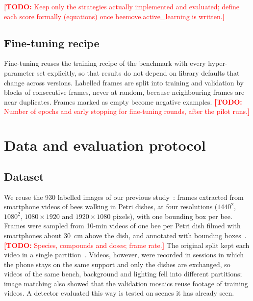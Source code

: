 \documentclass[pdflatex,sn-basic,Numbered]{sn-jnl}
\newcommand{\todo}[1]{\textcolor{red}{\textbf{[TODO:} #1\textbf{]}}}
\theoremstyle{thmstyleone}%
\begin{document}
\todo{Keep only the strategies actually implemented and evaluated; define each score formally (equations) once beemove.active\_learning is written.}

\subsection{Fine-tuning recipe}\label{sec:finetune}

Fine-tuning reuses the training recipe of the benchmark with every hyper-parameter set explicitly, so that results do not depend on library defaults that change across versions. Labelled frames are split into training and validation by blocks of consecutive frames, never at random, because neighbouring frames are near duplicates. Frames marked as empty become negative examples. \todo{Number of epochs and early stopping for fine-tuning rounds, after the pilot runs.}

\section{Data and evaluation protocol}\label{sec:protocol}

\subsection{Dataset}\label{sec:dataset}

We reuse the 930 labelled images of our previous study~\cite{lima2025analyzing}: frames extracted from smartphone videos of bees walking in Petri dishes, at four resolutions ($1440^2$, $1080^2$, $1080\times1920$ and $1920\times1080$ pixels), with one bounding box per bee. Frames were sampled from 10-min videos of one bee per Petri dish filmed with smartphones about 30~cm above the dish, and annotated with bounding boxes~\cite{lima2025analyzing}. \todo{Species, compounds and doses; frame rate.} The original split kept each video in a single partition~\cite{lima2025analyzing}. Videos, however, were recorded in sessions in which the phone stays on the same support and only the dishes are exchanged, so videos of the same bench, background and lighting fell into different partitions; image matching also showed that the validation mosaics reuse footage of training videos. A detector evaluated this way is tested on scenes it has already seen. %
\end{document}
